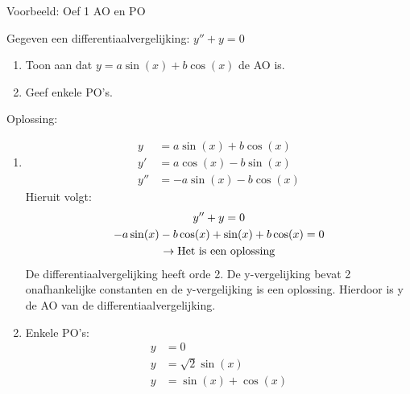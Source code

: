 \documentclass[12pt]{report}
\newcommand{\example}[2]{
      \hrulefill
      
      Voorbeeld: #1
      
      #2
      
      \hrulefill
}
\begin{document}
\example{Oef 1 AO en PO}{Gegeven een differentiaalvergelijking: $y'' + y = 0$
\begin{enumerate}
 \item Toon aan dat $y = a\sin(x) + b\cos(x)$ de AO is.
 \item Geef enkele PO's.
 \end{enumerate}
Oplossing:
\begin{enumerate}
 \item 
  \begin{equation*}
   \begin{split}
    y & = a\sin(x) + b\cos(x) \\
    y' & = a\cos(x) - b\sin(x) \\
    y'' & = -a\sin(x) - b\cos(x) 
   \end{split}
  \end{equation*}
  Hieruit volgt:
  \begin{gather*}
    y'' + y  = 0 \\
    -a\sin(x) - b\cos(x) + \sin(x) + b\cos(x)  = 0  \\
    \rightarrow \hbox{Het is een oplossing}
  \end{gather*}
  De differentiaalvergelijking heeft orde 2. De y-vergelijking bevat 2 onafhankelijke constanten en de y-vergelijking is een oplossing. Hierdoor is y de AO van de differentiaalvergelijking.
 \item Enkele PO's:
 \begin{equation*}
 \begin{split}
  y & = 0\\
  y & = \sqrt{2}\sin(x) \\
  y & = \sin(x) + \cos(x)
 \end{split}
 \end{equation*}
\end{enumerate}
}
\end{document}
